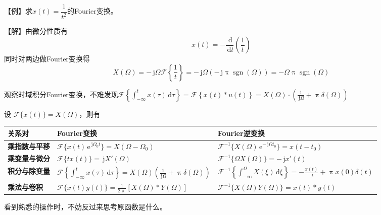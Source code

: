 \documentclass[UTF8,fontset=fandol,zihao=5]{ctexart}
\newcommand{\jj}{\,\mathrm{j}}
\newcommand{\ee}{\,\mathrm{e}}
\newcommand{\dd}{\,\mathrm{d}}
\newcommand{\FF}{\mathcal{F}}
\begin{document}
\begin{methodbox}[【技巧】用微分性质求Fourier变换]
  【例】求$x(t)=\dfrac{1}{t^2}$的Fourier变换。
  
  【解】由微分性质有
  \[
  x(t)=-\frac{\dd}{\dd t}\left ( \frac{1}{t} \right )
  \]
  同时对两边做Fourier变换得
  \[
  X(\varOmega) = -\jj \varOmega \FF \left \{ \frac{1}{t} \right \} = -\jj \varOmega \left ( -\jj \uppi \operatorname{sgn}(\varOmega) \right ) = - \varOmega \uppi \operatorname{sgn} (\varOmega)
  \]
\end{methodbox}

\begin{methodbox}[【理解】微分的实际意义]
  观察时域积分Fourier变换，不难发现$\displaystyle \FF \left\{ \int_{-\infty}^{t} x(\tau)\dd\tau \right\} = \FF\left\{x(t) \ast u(t) \right\} = X(\varOmega) \cdot \left( \frac{1}{\jj\varOmega} + \uppi\delta(\varOmega) \right)$
\end{methodbox}

\begin{methodbox}[【技巧】时频变换对应]
  设 $\FF\{x(t)\}=X(\varOmega)$，则有

  \begin{center}
  \begin{tabularx}{0.98\textwidth}{>{\bfseries}p{2.4cm}X X}
  \toprule
  关系对 & Fourier变换 & Fourier逆变换 \\
  \midrule

  乘指数与平移
  &
  $\displaystyle
  \FF\{x(t)\ee^{\jj\varOmega_0 t}\}
  =
  X(\varOmega-\varOmega_0)
  $
  &
  $\displaystyle
  \FF^{-1}
  \{X(\varOmega)\ee^{-\jj\varOmega t_0}\}
  =
  x(t-t_0)
  $
  \\

  乘变量与微分
  &
  $\displaystyle
  \FF\{t x(t)\}
  =
  \jj X'(\varOmega)
  $
  &
  $\displaystyle
  \FF^{-1}\{\varOmega X(\varOmega)\}
  =
  -\jj x'(t)
  $
  \\

  积分与除变量
  &
  $\displaystyle
  \FF
  \left\{
    \int_{-\infty}^{t}x(\tau)\dd\tau
  \right\}
  =
  X(\varOmega)
  \left(
    \frac{1}{\jj\varOmega}
    +
    \uppi\delta(\varOmega)
  \right)
  $
  &
  $\displaystyle
  \FF^{-1}
  \left\{
    \int_{-\infty}^{\varOmega}X(\xi)\dd\xi
  \right\}
  =
  -\frac{x(t)}{\jj t}
  +
  \uppi x(0)\delta(t)
  $
  \\

  乘法与卷积
  &
  $\displaystyle
  \FF\{x(t)y(t)\}
  =
  \frac{1}{2\uppi}
  \left[
    X(\varOmega)\ast Y(\varOmega)
  \right]
  $
  &
  $\displaystyle
  \FF^{-1}
  \{X(\varOmega)Y(\varOmega)\}
  =
  x(t)\ast y(t)
  $
  \\

  \bottomrule
  \end{tabularx}
  \end{center}

  看到熟悉的操作时，不妨反过来思考原函数是什么。
\end{methodbox}
\end{document}
